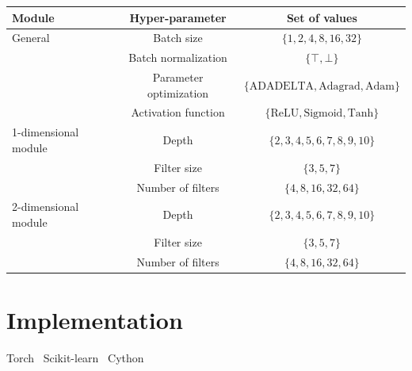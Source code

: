 
  \begin{table}[H]
    \centering
    \begin{tabular}{|l|c|c|}
      \hline
      Module & Hyper-parameter & Set of values \\
      \hline
      \hline
      General & Batch size & $\{ 1, 2, 4, 8, 16, 32 \}$ \\
              & Batch normalization & $\{ \top, \bot \}$ \\
              & Parameter optimization & $\{ \text{ADADELTA}, \text{Adagrad}, \text{Adam} \}$ \\
              & Activation function & $\{ \text{ReLU}, \text{Sigmoid}, \text{Tanh} \}$ \\
      \hline
      1-dimensional module & Depth & $\{ 2, 3, 4, 5, 6, 7, 8, 9, 10 \}$ \\
                           & Filter size & $\{ 3, 5, 7 \}$ \\
                           & Number of filters & $\{ 4, 8, 16, 32, 64 \}$ \\
      \hline
      2-dimensional module & Depth & $\{ 2, 3, 4, 5, 6, 7, 8, 9, 10 \}$ \\
                           & Filter size & $\{ 3, 5, 7 \}$ \\
                           & Number of filters & $\{ 4, 8, 16, 32, 64 \}$ \\
      \hline
    \end{tabular}
    \label{hyperparams}
  \end{table}

\section{Implementation}

  Torch~\cite{torch}
  Scikit-learn~\cite{scikit-learn}
  Cython~\cite{behnel2010cython}
